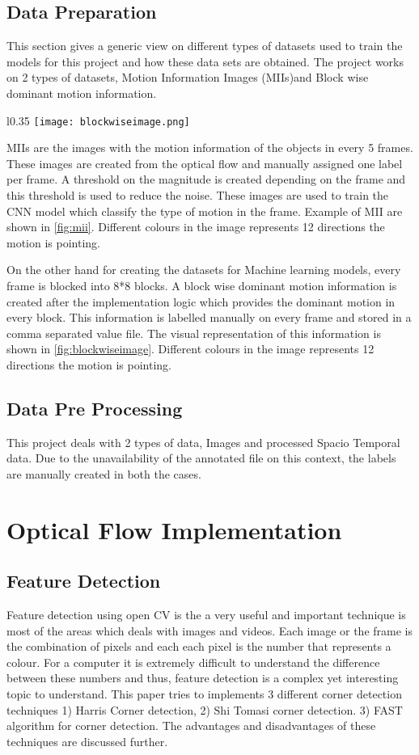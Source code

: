 \section{Data Preparation}
This section gives a generic view on different types of datasets used to train the models for this project and how these data sets are obtained. The project works on 2 types of datasets, Motion Information Images (MIIs)and Block wise dominant motion information. 
\begin{wrapfigure}{l}{0.35\textwidth}
    \centering
    \texttt{[image: blockwiseimage.png]}
	\caption{Block wise dominant motion Information}
	\label{fig:blockwiseimage}
\end{wrapfigure}
MIIs are the images with the motion information of the objects in every 5 frames. These images are created from the optical flow and manually assigned one label per frame. A threshold on the magnitude is created depending on the frame and this threshold is used to reduce the noise. These images are used to train the CNN model which classify the type of motion in the frame. Example of MII are shown in \ref{fig:mii}. Different colours in the image represents 12 directions the motion is pointing.

On the other hand for creating the datasets for Machine learning models, every frame is blocked into 8*8 blocks. A block wise dominant motion information is created after the implementation logic which provides the dominant motion in every block. This information is labelled manually on every frame and stored in a comma separated value file. The visual representation of this information is shown in \ref{fig:blockwiseimage}. Different colours in the image represents 12 directions the motion is pointing.

\section{Data Pre Processing}
This project deals with 2 types of data, Images and processed Spacio Temporal data. Due to the unavailability of the annotated file on this context, the labels are manually created in both the cases. 

\chapter{Optical Flow Implementation}
\section{Feature Detection}
Feature detection using open CV is the a very useful and important technique is most of the areas which deals with images and videos. Each image or the frame is the combination of pixels and each each pixel is the number that represents a colour. For a computer it is extremely difficult to understand the difference between these numbers and thus, feature detection is a complex yet interesting topic to understand. This paper tries to implements 3 different corner detection techniques 1) Harris Corner detection, 2) Shi Tomasi corner detection. 3) FAST algorithm for corner detection. The advantages and disadvantages of these techniques are discussed further.
